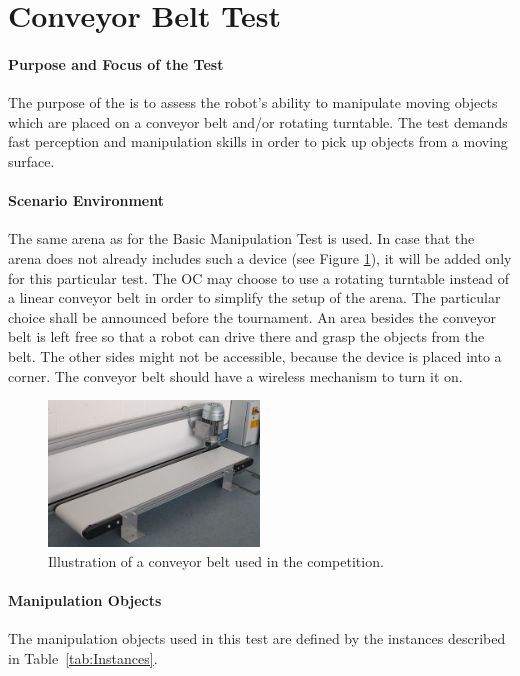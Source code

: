 \newpage
\section{Conveyor Belt Test}


\paragraph{Purpose and Focus of the Test}
The purpose of the  is to assess the robot's ability to manipulate moving objects which are placed on a conveyor belt and/or rotating turntable. The test demands fast perception and manipulation skills in order to pick up objects from a moving surface.

\paragraph{Scenario Environment}
The same arena as for the Basic Manipulation Test is used. In case that the arena does not already includes such a device (see Figure \ref{fig:conveyor_belt}), it will be added only for this particular test.
The OC may choose to use a rotating turntable instead of a linear conveyor belt in order to simplify the setup of the arena. The particular choice shall be announced before the tournament.
An area besides the conveyor belt is left free so that a robot can drive there and grasp the objects from the belt. The other sides might not be accessible, because the device is placed into a corner. 
The conveyor belt should have a wireless mechanism to turn it on. 

\begin{figure} [h!]
\centering
\includegraphics[width=0.5\textwidth ]{./images/conveyor_belt.jpg}
\caption{Illustration of a conveyor belt used in the competition.}
\label{fig:conveyor_belt}
\end{figure}


\paragraph{Manipulation Objects}
The manipulation objects used in this test are defined by the instances described in Table~\ref{tab:Instances}.

